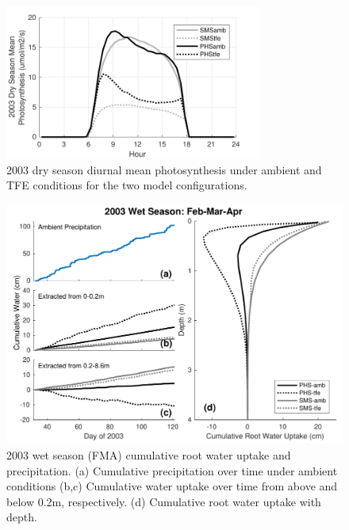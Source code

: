 \documentclass[draft,linenumbers]{agujournal}
\begin{document}
        \clearpage

    \begin{figure}[h]
     \centering
     \includegraphics[width=20pc]{../figs3/suppfpsn.pdf}
     \caption{2003 dry season diurnal mean photosynthesis under ambient and TFE conditions for the two model configurations.
     }
     \label{supp:fpsn}
  \end{figure}


    \begin{figure}[h]
     \centering
     \includegraphics[width=30pc]{../figs3/qwet.pdf}
     \caption{2003 wet season (FMA) cumulative root water uptake and precipitation. 
     (a) Cumulative precipitation over time under ambient conditions
     (b,c) Cumulative water uptake over time from above and below 0.2m, respectively.
     (d) Cumulative root water uptake with depth.
     }
     \label{fig:qwet}
  \end{figure}
\end{document}
